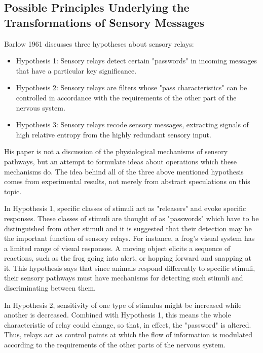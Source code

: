 \documentclass[twoside]{article}
\begin{document}
\begin{multicols}{2}

\section{Possible Principles Underlying the Transformations of Sensory Messages}

Barlow 1961 discusses three hypotheses about sensory relays:
\begin{itemize}
	\item Hypothesis 1: Sensory relays detect certain "passwords" in incoming messages that have a particular key significance.
	\item Hypothesis 2: Sensory relays are filters whose "pass characteristics" can be controlled in accordance with the requirements of the other part of the nervous system.
	\item Hypothesis 3: Sensory relays recode sensory messages, extracting signals of high relative entropy from the highly redundant sensory input.
\end{itemize}
His paper is not a discussion of the physiological mechanisms of sensory pathways, but an attempt to formulate ideas about operations which these mechanisms do. The idea behind all of the three above mentioned hypothesis comes from experimental results, not merely from abstract speculations on this topic. 

In Hypothesis 1, specific classes of stimuli act as "releasers" and evoke specific responses. These classes of stimuli are thought of as "passwords" which have to be distinguished from other stimuli and it is suggested that their detection may be the important function of sensory relays. For instance, a frog's visual system has a limited range of visual responses. A moving object elicits a sequence of reactions, such as the frog going into alert, or hopping forward and snapping at it. This hypothesis says that since animals respond differently to specific stimuli, their sensory pathways must have mechanisms for detecting such stimuli and discriminating between them. 

In Hypothesis 2, sensitivity of one type of stimulus might be increased while another is decreased. Combined with Hypothesis 1, this means the whole characteristic of relay could change, so that, in effect, the "password" is altered. Thus, relays act as control points at which the flow of information is modulated according to the requirements of the other parts of the nervous system.


\end{multicols}
\end{document}
